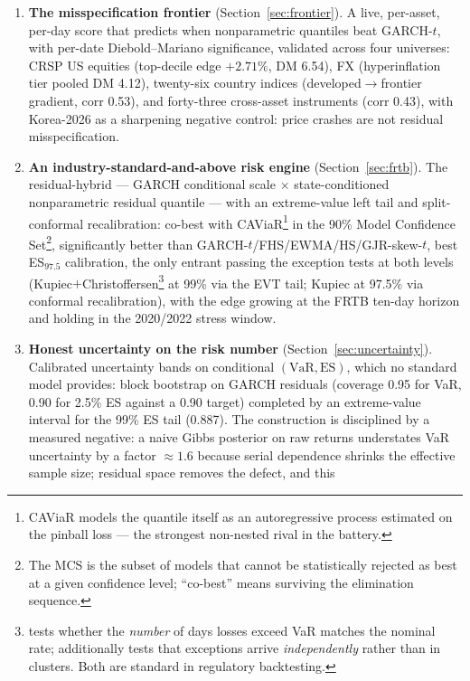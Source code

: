 \documentclass[11pt]{article}
\newcommand{\VaR}{\mathrm{VaR}}
\newcommand{\ES}{\mathrm{ES}}
\theoremstyle{remark}
\begin{document}
\begin{enumerate}[leftmargin=1.6em]
\item \textbf{The misspecification frontier} (Section~\ref{sec:frontier}).
A live, per-asset, per-day score that predicts when nonparametric
quantiles beat GARCH-$t$, with per-date Diebold--Mariano
significance, validated across four universes: CRSP US equities
(top-decile edge $+2.71\%$, DM 6.54), FX (hyperinflation tier pooled DM
4.12), twenty-six country indices (developed$\to$frontier gradient,
corr 0.53), and forty-three cross-asset instruments (corr 0.43), with
Korea-2026 as a sharpening negative control: price crashes are not
residual misspecification.
\item \textbf{An industry-standard-and-above risk engine}
(Section~\ref{sec:frtb}). The residual-hybrid --- GARCH conditional
scale $\times$ state-conditioned nonparametric residual quantile ---
with an extreme-value left tail and split-conformal recalibration:
co-best with CAViaR\footnote{CAViaR \citep{engle2004caviar} models the
quantile itself as an autoregressive process estimated on the pinball
loss --- the strongest non-nested rival in the battery.} in the 90\%
Model Confidence Set\footnote{The MCS \citep{hansen2011mcs} is the
subset of models that cannot be statistically rejected as best at a
given confidence level; ``co-best'' means surviving the elimination
sequence.}, significantly
better than GARCH-$t$/FHS/EWMA/HS/GJR-skew-$t$, best ES$_{97.5}$
calibration, the only entrant passing the exception tests at both levels
(Kupiec$+$Christoffersen\footnote{\citet{kupiec1995} tests whether the
\emph{number} of days losses exceed VaR matches the nominal rate;
\citet{christoffersen1998} additionally tests that exceptions arrive
\emph{independently} rather than in clusters. Both are standard in
regulatory backtesting.} at 99\% via the EVT tail; Kupiec at 97.5\% via
conformal recalibration), with the edge growing at the FRTB ten-day horizon and
holding in the 2020/2022 stress window.
\item \textbf{Honest uncertainty on the risk number}
(Section~\ref{sec:uncertainty}). Calibrated uncertainty bands on
conditional $(\VaR,\ES)$, which no standard model provides: block
bootstrap on GARCH residuals (coverage 0.95 for VaR, 0.90 for 2.5\% ES
against a 0.90 target) completed by an extreme-value interval for the
99\% ES tail (0.887). The construction is disciplined by a measured
negative: a naive Gibbs posterior on raw returns understates VaR
uncertainty by a factor $\approx 1.6$ because serial dependence shrinks
the effective sample size; residual space removes the defect, and this

\end{enumerate}
\end{document}
